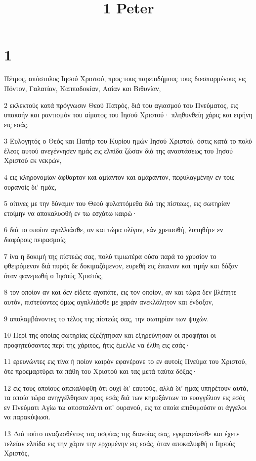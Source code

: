 

\title{1 Peter}


\chapter{1}

\par Πέτρος, απόστολος Ιησού Χριστού, προς τους παρεπιδήμους τους διεσπαρμένους εις Πόντον, Γαλατίαν, Καππαδοκίαν, Ασίαν και Βιθυνίαν,
\par 2 εκλεκτούς κατά πρόγνωσιν Θεού Πατρός, διά του αγιασμού του Πνεύματος, εις υπακοήν και ραντισμόν του αίματος του Ιησού Χριστού· πληθυνθείη χάρις και ειρήνη εις εσάς.
\par 3 Ευλογητός ο Θεός και Πατήρ του Κυρίου ημών Ιησού Χριστού, όστις κατά το πολύ έλεος αυτού ανεγέννησεν ημάς εις ελπίδα ζώσαν διά της αναστάσεως του Ιησού Χριστού εκ νεκρών,
\par 4 εις κληρονομίαν άφθαρτον και αμίαντον και αμάραντον, πεφυλαγμένην εν τοις ουρανοίς δι' ημάς,
\par 5 οίτινες με την δύναμιν του Θεού φυλαττόμεθα διά της πίστεως, εις σωτηρίαν ετοίμην να αποκαλυφθή εν τω εσχάτω καιρώ·
\par 6 διά το οποίον αγαλλιάσθε, αν και τώρα ολίγον, εάν χρειασθή, λυπηθήτε εν διαφόροις πειρασμοίς,
\par 7 ίνα η δοκιμή της πίστεώς σας, πολύ τιμιωτέρα ούσα παρά το χρυσίον το φθειρόμενον διά πυρός δε δοκιμαζόμενον, ευρεθή εις έπαινον και τιμήν και δόξαν όταν φανερωθή ο Ιησούς Χριστός,
\par 8 τον οποίον αν και δεν είδετε αγαπάτε, εις τον οποίον, αν και τώρα δεν βλέπητε αυτόν, πιστεύοντες όμως αγαλλιάσθε με χαράν ανεκλάλητον και ένδοξον,
\par 9 απολαμβάνοντες το τέλος της πίστεώς σας, την σωτηρίαν των ψυχών.
\par 10 Περί της οποίας σωτηρίας εξεζήτησαν και εξηρεύνησαν οι προφήται οι προφητεύσαντες περί της χάριτος, ήτις έμελλε να έλθη εις εσάς·
\par 11 ερευνώντες εις τίνα ή ποίον καιρόν εφανέρονε το εν αυτοίς Πνεύμα του Χριστού, ότε προεμαρτύρει τα πάθη του Χριστού και τας μετά ταύτα δόξας·
\par 12 εις τους οποίους απεκαλύφθη ότι ουχί δι' εαυτούς, αλλά δι' ημάς υπηρέτουν αυτά, τα οποία τώρα ανηγγέλθησαν προς εσάς διά των κηρυξάντων το ευαγγέλιον εις εσάς εν Πνεύματι Αγίω τω αποσταλέντι απ' ουρανού, εις τα οποία επιθυμούσιν οι άγγελοι να παρακύψωσι.
\par 13 Διά τούτο αναζωσθέντες τας οσφύας της διανοίας σας, εγκρατεύεσθε και έχετε τελείαν ελπίδα εις την χάριν την ερχομένην εις εσάς, όταν αποκαλυφθή ο Ιησούς Χριστός,
